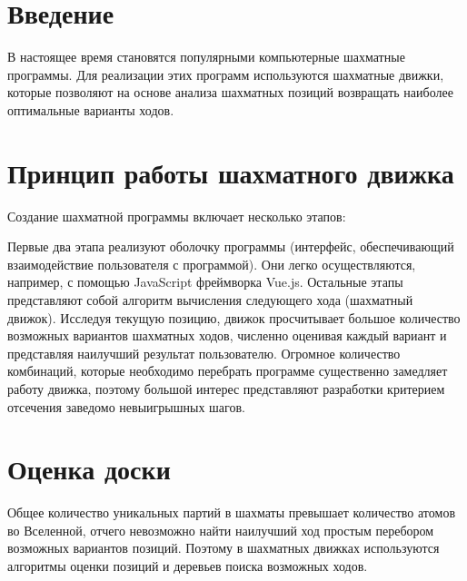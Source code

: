 \documentclass[a4paper,10pt,twoside]{article}
\begin{document}
\begin{multicols}{2} %



\section*{Введение}
В настоящее время становятся популярными компьютерные шахматные программы. Для реализации этих программ используются шахматные движки, которые позволяют на основе анализа шахматных позиций возвращать наиболее оптимальные варианты ходов. 



\section{Принцип работы шахматного движка}
Создание шахматной программы включает несколько этапов:


Первые два этапа реализуют оболочку программы (интерфейс, обеспечивающий взаимодействие пользователя с программой). Они легко осуществляются, например, с помощью JavaScript фреймворка Vue.js. Остальные этапы представляют собой алгоритм вычисления следующего хода (шахматный движок). Исследуя текущую позицию, движок просчитывает большое количество возможных вариантов шахматных ходов, численно оценивая каждый вариант и представляя наилучший результат пользователю. Огромное количество комбинаций, которые необходимо перебрать программе существенно замедляет работу движка, поэтому большой интерес представляют разработки критерием отсечения заведомо невыигрышных шагов.



\section{Оценка доски}
Общее количество уникальных партий в шахматы превышает количество атомов во Вселенной, отчего невозможно найти наилучший ход простым перебором возможных вариантов позиций. Поэтому в шахматных движках используются алгоритмы оценки позиций и деревьев поиска возможных ходов.


\end{multicols}
\end{document}
